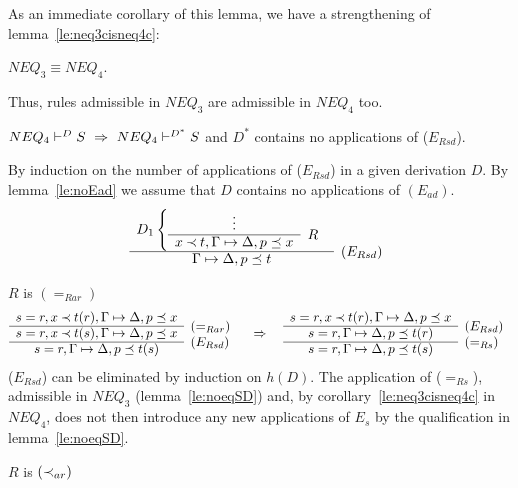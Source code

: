 %
\noindent
As an immediate corollary of this lemma, we have a strengthening of 
lemma~\ref{le:neq3cisneq4c}: 
\begin{COROLLARY}\label{co:neq3isneq4}
$NEQ_3\equiv NEQ_4$.
\end{COROLLARY}
Thus, rules admissible in $NEQ_3$ are admissible in $NEQ_4$ too.
%
\begin{LEMMA}\label{le:noErsd} ${NEQ_4}\vdash^{{D}}S\ \mathrel\Rightarrow\ {NEQ_4}\vdash^{{D^*}}S$
and $D^*$ contains no applications of ($E_{Rsd}$).
\end{LEMMA}
\begin{PROOF}
By induction on the number of applications of ($E_{Rsd}$) in a given
derivation $D$. By lemma~\ref{le:noEad} %
we assume that $D$ contains no applications of $(E_{ad})$.
\[ \begin{array}{cl}
D_1\left\{ \begin{array}{cl}
 \vdots & \\ \cline{1-1}
 x\Incl t,\GSD,p\preceq x & \raisebox{1.2ex}[1.5ex][0ex]{$R$}\end{array} \right. \\ \cline{1-1}
 \GSD,p\preceq t  &  \raisebox{1.2ex}[1.5ex][0ex]{($E_{Rsd}$)}
\end{array} \]
\begin{LS}
\item $R$ is $(=_{Rar})$
\[ \begin{array}{cl}
s=r, x\Incl t(r),\GSD, p\preceq x  & \\ \cline{1-1}
s=r, x\Incl t(s),\GSD,p\preceq x & \raisebox{1.2ex}[1.5ex][0ex]{($=_{Rar}$)} \\ \cline{1-1}
s=r,\GSD,p\preceq t(s)  &  \raisebox{1.2ex}[1.5ex][0ex]{($E_{Rsd}$)}
\end{array} 
\conv 
\begin{array}{cl}
 s=r,x\Incl t(r),\GSD, p\preceq x  & \\ \cline{1-1}
 s=r, \GSD,p\preceq t(r) & \raisebox{1.2ex}[1.5ex][0ex]{($E_{Rsd}$)} \\ \cline{1-1}
 s=r, \GSD,p\preceq t(s) & \raisebox{1.2ex}[1.5ex][0ex]{($=_{Rs}$)} 
\end{array}
\]
($E_{Rsd}$) can be eliminated by induction on $h(D)$. 
The application of ($=_{Rs}$), admissible in $NEQ_3$ (lemma~\ref{le:noeqSD}) and, 
by corollary~\ref{le:neq3cisneq4c} in $NEQ_4$, does not then introduce any new
applications of $E_s$ by the qualification in lemma~\ref{le:noeqSD}.
\item $R$ is $(\mathbin{\prec}_{ar})$
\[ \begin{array}{cl}

\end{array}\]
\end{LS}
\end{PROOF}
